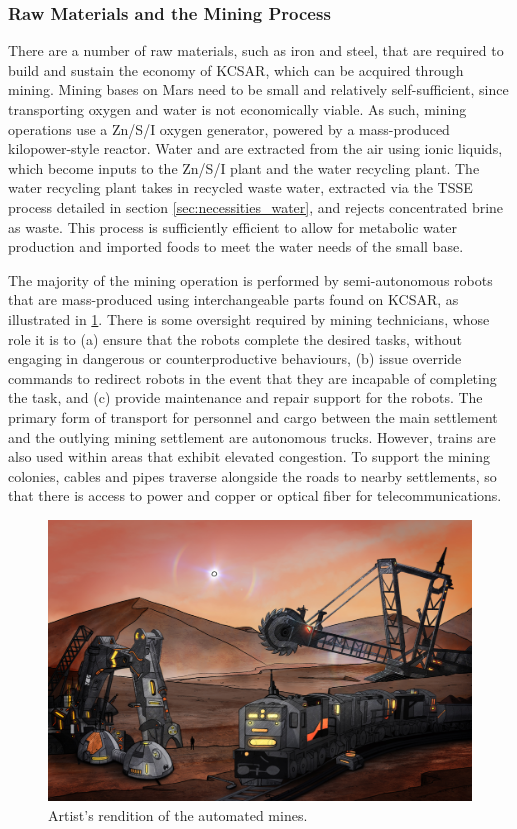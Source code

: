 \documentclass[fleqn,10pt]{Stylesheet} %
\begin{document}
\subsubsection{Raw Materials and the Mining Process}
\label{sec:necessities_raw}

There are a number of raw materials, such as iron and steel, that are required to build and sustain the economy of KCSAR, which can be acquired through mining. Mining bases on Mars need to be small and relatively self-sufficient, since transporting oxygen and water is not economically viable. As such, mining operations use a Zn/S/I oxygen generator, powered by a mass-produced kilopower-style \cite{KilopowerNASA} reactor. Water and  are extracted from the air using ionic liquids, which become inputs to the Zn/S/I plant and the water recycling plant. The water recycling plant takes in recycled waste water, extracted via the TSSE process detailed in section \ref{sec:necessities_water}, and rejects concentrated brine as waste. This process is sufficiently efficient to allow for metabolic water production and imported foods to meet the water needs of the small base.

The majority of the mining operation is performed by semi-autonomous robots that are mass-produced using interchangeable parts found on KCSAR, as illustrated in \ref{fig:mines}. There is some oversight required by mining technicians, whose role it is to (a) ensure that the robots complete the desired tasks, without engaging in dangerous or counterproductive behaviours, (b) issue override commands to redirect robots in the event that they are incapable of completing the task, and (c) provide maintenance and repair support for the robots. The primary form of transport for personnel and cargo between the main settlement and the outlying mining settlement are autonomous trucks. However, trains are also used within areas that exhibit elevated congestion. To support the mining colonies, cables and pipes traverse alongside the roads to nearby settlements, so that there is access to power and copper or optical fiber for telecommunications.

\begin{figure}
    \centering
    \includegraphics[width=\linewidth]{art/mining.jpg}
    \caption{Artist's rendition of the automated mines.}
    \label{fig:mines}
\end{figure}
\end{document}
